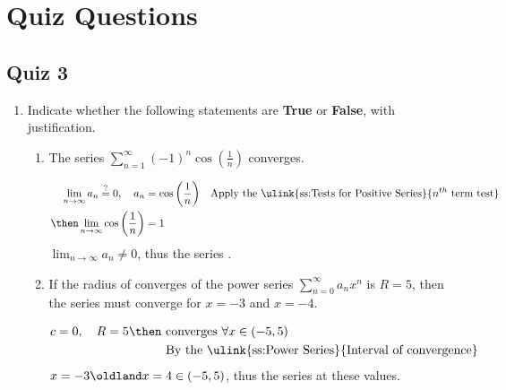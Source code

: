 \chapter{Quiz Questions}

\section{Quiz 3}
\begin{enumerate}
  \item Indicate whether the following statements are \textbf{True} or
    \textbf{False}, with justification.

  \begin{enumerate}[itemsep=12em]
    \item The series \(\displaystyle \sum_{n=1}^{\infty} (-1)^n \cos
      \left(\frac{1}{n}\right) \) converges.

      \begin{align*}
        \lim_{n \to \infty} a_n \stackrel{?}{=} 0, \quad a_n &= \cos \left(\frac{1}{n}\right)
        && \text{Apply the \ulink{ss:Tests for Positive Series}{\(n^{th} \) term test}} \\
        \then \lim_{n \to \infty} \cos\left( \frac{1}{n} \right) &= 1
      \end{align*}
      \(\lim_{n \to \infty} a_n \neq 0\), thus the series .

    \item If the radius of converges of the power series \(\displaystyle
      \sum_{n=0}^{\infty} a_nx^n \) is \(R=5\), then the series must converge
      for \(x = -3\) and \(x = -4\).

      \begin{align*}
        c = 0, \quad R = 5 \then ~&\text{converges}~\forall x \in (-5, 5) \\
        &\text{By the \ulink{ss:Power Series}{Interval of convergence}}
      \end{align*}
      \(x = -3 \oldland x = 4 \in (-5, 5)\), thus the series  at
      these values.
  \end{enumerate}


\end{enumerate}
